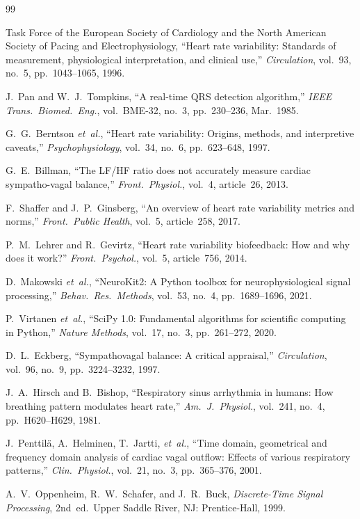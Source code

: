 \documentclass[conference]{IEEEtran}
\begin{document}
\begin{thebibliography}{99}

Task Force of the European Society of Cardiology and the North
American Society of Pacing and Electrophysiology,
``Heart rate variability: Standards of measurement, physiological
interpretation, and clinical use,''
\emph{Circulation}, vol.~93, no.~5, pp.~1043--1065, 1996.

J.~Pan and W.~J.~Tompkins,
``A real-time QRS detection algorithm,''
\emph{IEEE Trans.\ Biomed.\ Eng.}, vol.~BME-32, no.~3,
pp.~230--236, Mar.~1985.

G.~G.~Berntson \emph{et~al.},
``Heart rate variability: Origins, methods, and interpretive
caveats,''
\emph{Psychophysiology}, vol.~34, no.~6, pp.~623--648, 1997.

G.~E.~Billman,
``The LF/HF ratio does not accurately measure cardiac
sympatho-vagal balance,''
\emph{Front.\ Physiol.}, vol.~4, article~26, 2013.

F.~Shaffer and J.~P.~Ginsberg,
``An overview of heart rate variability metrics and norms,''
\emph{Front.\ Public Health}, vol.~5, article~258, 2017.

P.~M.~Lehrer and R.~Gevirtz,
``Heart rate variability biofeedback: How and why does it work?''
\emph{Front.\ Psychol.}, vol.~5, article~756, 2014.

D.~Makowski \emph{et~al.},
``NeuroKit2: A Python toolbox for neurophysiological signal
processing,''
\emph{Behav.\ Res.\ Methods}, vol.~53, no.~4, pp.~1689--1696,
2021.

P.~Virtanen \emph{et~al.},
``SciPy 1.0: Fundamental algorithms for scientific computing in
Python,''
\emph{Nature Methods}, vol.~17, no.~3, pp.~261--272, 2020.

D.~L.~Eckberg,
``Sympathovagal balance: A critical appraisal,''
\emph{Circulation}, vol.~96, no.~9, pp.~3224--3232, 1997.

J.~A.~Hirsch and B.~Bishop,
``Respiratory sinus arrhythmia in humans: How breathing pattern
modulates heart rate,''
\emph{Am.\ J.\ Physiol.}, vol.~241, no.~4, pp.~H620--H629, 1981.

J.~Penttil\"a, A.~Helminen, T.~Jartti, \emph{et~al.},
``Time domain, geometrical and frequency domain analysis of cardiac
vagal outflow: Effects of various respiratory patterns,''
\emph{Clin.\ Physiol.}, vol.~21, no.~3, pp.~365--376, 2001.

A.~V.~Oppenheim, R.~W.~Schafer, and J.~R.~Buck,
\emph{Discrete-Time Signal Processing}, 2nd~ed.\
Upper Saddle River, NJ: Prentice-Hall, 1999.

\end{thebibliography}
\end{document}
